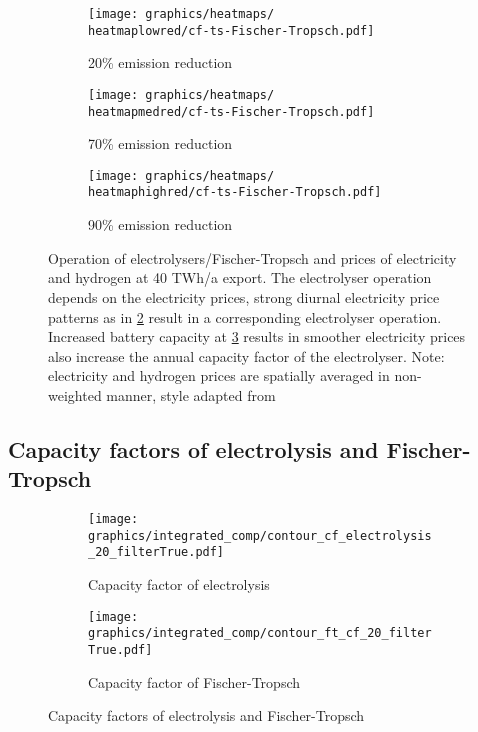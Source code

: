 \begin{figure}[h]
    \begin{subfigure}[h]{0.33\textwidth}
        \centering
        \texttt{[image: graphics/heatmaps/\\heatmaplowred/cf-ts-Fischer-Tropsch.pdf]}
        \caption{20\% emission reduction}
        \label{fig:operation20}
    \end{subfigure}
    \begin{subfigure}[h]{0.33\textwidth}
        \centering
        \texttt{[image: graphics/heatmaps/\\heatmapmedred/cf-ts-Fischer-Tropsch.pdf]}
        \caption{70\% emission reduction}
        \label{fig:operation70}
    \end{subfigure}
    \begin{subfigure}[h]{0.33\textwidth}
        \centering
        \texttt{[image: graphics/heatmaps/\\heatmaphighred/cf-ts-Fischer-Tropsch.pdf]}
        \caption{90\% emission reduction}
        \label{fig:operation90}
    \end{subfigure}

    \caption{Operation of electrolysers/Fischer-Tropsch and prices of electricity and hydrogen at 40 TWh/a export. The electrolyser operation depends on the electricity prices, strong diurnal electricity price patterns as in \ref{fig:operation70} result in a corresponding electrolyser operation. Increased battery capacity at \ref{fig:operation90} results in smoother electricity prices also increase the annual capacity factor of the electrolyser. Note: electricity and hydrogen prices are spatially averaged in non-weighted manner, style adapted from \cite{Neumann2022}}
    \label{fig:operation-ely-ft}
\end{figure}



\subsection{Capacity factors of electrolysis and Fischer-Tropsch}

\begin{figure*}[h] %
    \centering
    \begin{subfigure}[b]{0.49\linewidth}
        \centering
        \texttt{[image: graphics/integrated\_comp/contour\_cf\_electrolysis\_20\_filterTrue.pdf]}
        \caption{Capacity factor of electrolysis}
        \label{fig:cf-ely}
    \end{subfigure}
    \hfill
    \begin{subfigure}[b]{0.49\linewidth}
        \centering
        \texttt{[image: graphics/integrated\_comp/contour\_ft\_cf\_20\_filterTrue.pdf]}
        \caption{Capacity factor of Fischer-Tropsch}
        \label{fig:cf-ft}
    \end{subfigure}
    \hfill
    \caption{Capacity factors of electrolysis and Fischer-Tropsch}
    \label{fig:cf-ely-ft}
\end{figure*}



\clearpage